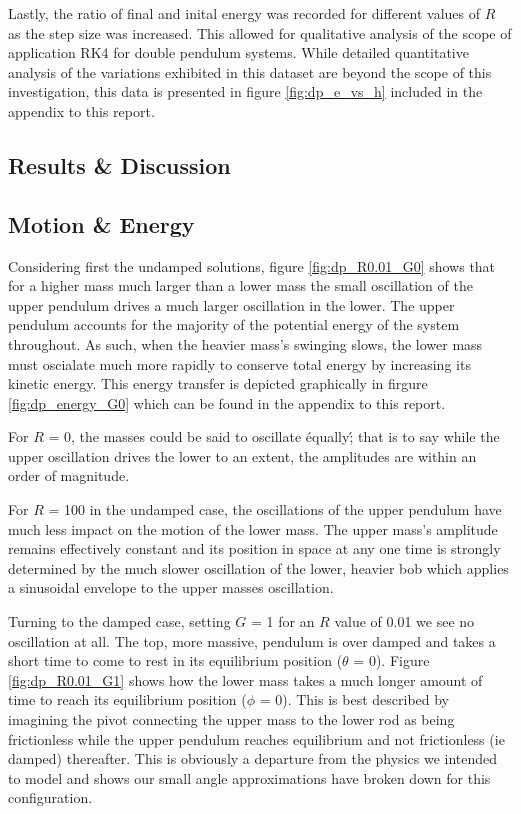 \documentclass[11pt]{article}
\begin{document}
%
%

Lastly, the ratio of final and inital energy was recorded for different values of $R$ as the step size was increased. This allowed for qualitative analysis of the scope of application RK4 for double pendulum systems. While detailed quantitative analysis of the variations exhibited in this dataset are beyond the scope of this investigation, this data is presented in figure \ref{fig:dp_e_vs_h} included in the appendix to this report.
%
%

\subsection{Results \& Discussion}
\subsection*{Motion \& Energy}
Considering first the undamped solutions, figure \ref{fig:dp_R0.01_G0} shows that for a higher mass much larger than a lower mass the small oscillation of the upper pendulum drives a much larger oscillation in the lower. The upper pendulum accounts for the majority of the potential energy of the system throughout. As such, when the heavier mass's swinging slows, the lower mass must oscialate much more rapidly to conserve total energy by increasing its kinetic energy.
This energy transfer is depicted graphically in firgure \ref{fig:dp_energy_G0} which can be found in the appendix to this report.

For $R$ = 0, the masses could be said to oscillate \'equally\'; that is to say while the upper oscillation drives the lower to an extent, the amplitudes are within an order of magnitude.

For $R$ = 100 in the undamped case, the oscillations of the upper pendulum have much less impact on the motion of the lower mass. The upper mass's amplitude remains effectively constant and its position in space at any one time is strongly determined by the much slower oscillation of the lower, heavier bob which applies a sinusoidal envelope to the upper masses oscillation.

Turning to the damped case, setting $G$ = 1 for an $R$ value of 0.01 we see no oscillation at all. The top, more massive, pendulum is over damped and takes a short time to come to rest in its equilibrium position ($\theta$ = 0). Figure \ref{fig:dp_R0.01_G1} shows how the lower mass takes a much longer amount of time to reach its equilibrium position ($\phi$ = 0). This is best described by imagining the pivot connecting the upper mass to the lower rod as being frictionless while the upper pendulum reaches equilibrium and not frictionless (ie damped) thereafter. This is obviously a departure from the physics we intended to model and shows our small angle approximations have broken down for this configuration.
\end{document}
